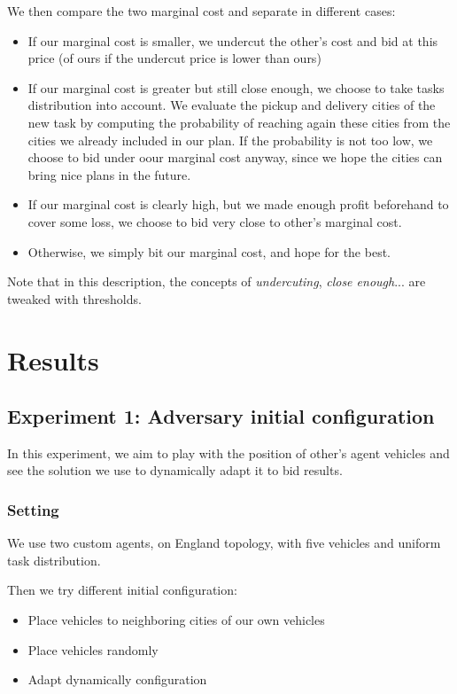 \documentclass[11pt]{article}
\begin{document}
We then compare the two marginal cost and separate in different cases:
\begin{itemize}
	\item If our marginal cost is smaller, we undercut the other's cost and bid at this price (of ours if the undercut price is lower than ours)
	\item If our marginal cost is greater but still close enough, we choose to take tasks distribution into account. We evaluate the pickup and delivery cities of the new task by computing the probability of reaching again these cities from the cities we already included in our plan. If the probability is not too low, we choose to bid under oour marginal cost anyway, since we hope the cities can bring nice plans in the future.
	\item If our marginal cost is clearly high, but we made enough profit beforehand to cover some loss, we choose to bid very close to other's marginal cost.
	\item Otherwise, we simply bit our marginal cost, and hope for the best.
\end{itemize}

Note that in this description, the concepts of \textit{undercuting}, \textit{close enough}... are tweaked with thresholds.


\section{Results}

\subsection{Experiment 1: Adversary initial configuration}
In this experiment, we aim to play with the position of other's agent vehicles and see the solution we use to dynamically adapt it to bid results.

\subsubsection{Setting}
We use two custom agents, on England topology, with five vehicles and uniform task distribution.

Then we try different initial configuration:
\begin{itemize}
	\item Place vehicles to neighboring cities of our own vehicles
	\item Place vehicles randomly
	\item Adapt dynamically configuration
\end{itemize}
\end{document}
